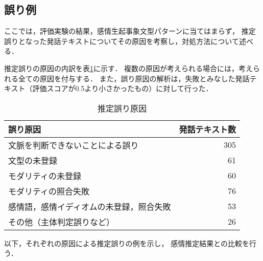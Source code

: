 \documentclass[japanese]{jnlp_1.3c}
\begin{document}
\subsection{誤り例}

ここでは，評価実験の結果，感情生起事象文型パターンに当てはまらず，
推定誤りとなった発話テキストについてその原因を考察し，対処方法について述べる．

推定誤りの原因の内訳を表\ref{tb:error_rate}に示す．
複数の原因が考えられる場合には，考えられる全ての原因を付与する．
また，誤り原因の解析は，失敗とみなした発話テキスト（評価スコアが0.5より小さかったもの）に対して行った．

\begin{table}[t]
\begin{center}
\caption{推定誤り原因}
\begin{tabular}{|l|r|}
\hline
誤り原因 & 発話テキスト数 \\ \hline \hline
文脈を判断できないことによる誤り &	305 \\ \hline
文型の未登録	&	61 \\ \hline
モダリティの未登録	&	60 \\ \hline
モダリティの照合失敗	&	76 \\ \hline
感情語，感情イディオムの未登録，照合失敗	&	53 \\ \hline
その他（主体判定誤りなど）	&	26 \\ \hline
\end{tabular}
\label{tb:error_rate}
\end{center}
\end{table}

以下，それぞれの原因による推定誤りの例を示し，
感情推定結果との比較を行う．
\end{document}
